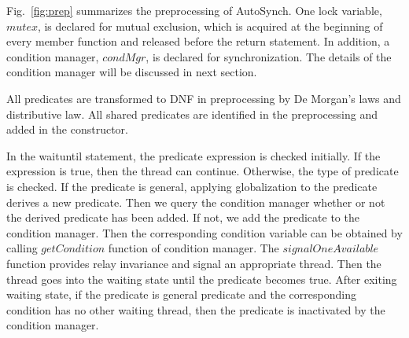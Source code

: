 \documentclass[preprint]{sigplanconf}
\begin{document}
Fig.~\ref{fig:prep} summarizes the preprocessing of AutoSynch. One lock 
variable, $mutex$, is declared for mutual exclusion, which is acquired at the 
beginning of every member function and released before the return statement.
In addition, a condition manager, $condMgr$, is declared for 
synchronization. The details of the condition manager will be discussed in next
section.  

All predicates are transformed to DNF in
preprocessing by De Morgan's laws and distributive law. All shared
predicates are identified in the preprocessing and added in the constructor. 


In the waituntil statement, the predicate expression is checked initially. If 
the expression is true, then the thread can continue. Otherwise, the type of
predicate is checked. If the predicate is general, applying globalization to 
the predicate derives a new predicate. Then we query the condition manager 
whether or not the derived predicate has been added. If not, we add the 
predicate to the condition manager. Then the corresponding condition variable
can be obtained by calling $getCondition$ function of condition manager. The
$signalOneAvailable$ function provides relay invariance and signal an
appropriate thread. Then the thread goes into the waiting state until the
predicate becomes true. After exiting waiting state, if the predicate is
general predicate and the corresponding condition has no other waiting thread,
then the predicate is inactivated by the condition manager.

%
%
\end{document}
